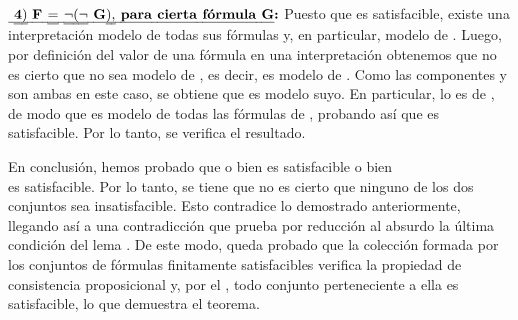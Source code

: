 \begin{isabellebody}
\begin{isamarkuptext}
\begin{demostracion}
      $\textbf{\isa{{\isasymfour}{\isacharparenright}\ F\ {\isacharequal}\ {\isasymnot}{\isacharparenleft}{\isasymnot}\ G{\isacharparenright}{\isacharcomma}\ para\ cierta\ fórmula\ G}:}$ Puesto que  es satisfacible, 
      existe una interpretación \isa{{\isasymA}} modelo de todas sus fórmulas y, en particular, modelo de . 
      Luego, por definición del valor de una fórmula en una interpretación obtenemos que no es 
      cierto que \isa{{\isasymA}} no sea modelo de , es decir, \isa{{\isasymA}} es modelo de . Como las componentes 
       y  son ambas  en este caso, se obtiene que \isa{{\isasymA}} es modelo suyo. En particular, lo 
      es de , de modo que \isa{{\isasymA}} es modelo de todas las fórmulas de , probando así que 
      es satisfacible. Por lo tanto, se verifica el resultado.
    
    En conclusión, hemos probado que o bien  es satisfacible o bien\\  es 
    satisfacible. Por lo tanto, se tiene que no es cierto que ninguno de los dos conjuntos sea
    insatisfacible. Esto contradice lo demostrado anteriormente, llegando así a una contradicción
    que prueba por reducción al absurdo la última condición del lema . De este modo, queda
    probado que la colección formada por los conjuntos de fórmulas finitamente satisfacibles 
    verifica la propiedad de consistencia proposicional y, por el , 
    todo conjunto perteneciente a ella es satisfacible, lo que demuestra el teorema.
  \end{demostracion}


\end{isamarkuptext}
\end{isabellebody}
